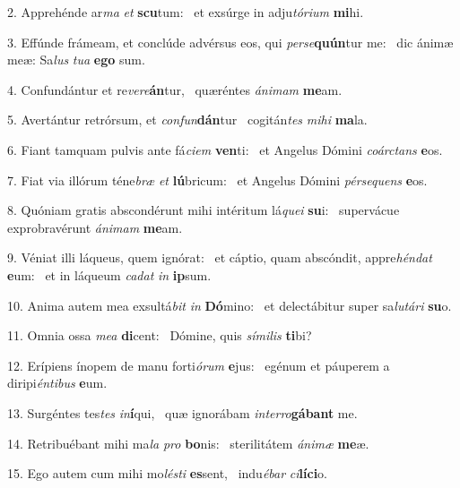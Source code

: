2. Apprehénde ar\textit{ma} \textit{et} \textbf{scu}tum: \ast\  et exsúrge in adju\textit{tó}\textit{ri}\textit{um} \textbf{mi}hi.\

3. Effúnde frámeam, et conclúde advérsus eos, qui \textit{per}\textit{se}\textbf{quún}tur me: \ast\  dic ánimæ meæ: Sa\textit{lus} \textit{tu}\textit{a} \textbf{e}\textbf{go} sum.\

4. Confundántur et re\textit{ve}\textit{re}\textbf{án}tur, \ast\  quæréntes \textit{á}\textit{ni}\textit{mam} \textbf{me}am.\

5. Avertántur retrórsum, et \textit{con}\textit{fun}\textbf{dán}tur \ast\  cogitán\textit{tes} \textit{mi}\textit{hi} \textbf{ma}la.\

6. Fiant tamquam pulvis ante fá\textit{ci}\textit{em} \textbf{ven}ti: \ast\  et Angelus Dómini \textit{co}\textit{árc}\textit{tans} \textbf{e}os.\

7. Fiat via illórum téne\textit{bræ} \textit{et} \textbf{lú}bricum: \ast\  et Angelus Dómini \textit{pér}\textit{se}\textit{quens} \textbf{e}os.\

8. Quóniam gratis abscondérunt mihi intéritum lá\textit{que}\textit{i} \textbf{su}i: \ast\  supervácue exprobravérunt \textit{á}\textit{ni}\textit{mam} \textbf{me}am.\

9. Véniat illi láqueus, quem ignórat: \dag\  et cáptio, quam abscóndit, appre\textit{hén}\textit{dat} \textbf{e}um: \ast\  et in láqueum \textit{ca}\textit{dat} \textit{in} \textbf{ip}sum.\

10. Anima autem mea exsultá\textit{bit} \textit{in} \textbf{Dó}mino: \ast\  et delectábitur super sa\textit{lu}\textit{tá}\textit{ri} \textbf{su}o.\

11. Omnia ossa \textit{me}\textit{a} \textbf{di}cent: \ast\  Dómine, quis \textit{sí}\textit{mi}\textit{lis} \textbf{ti}bi?\

12. Erípiens ínopem de manu forti\textit{ó}\textit{rum} \textbf{e}jus: \ast\  egénum et páuperem a diripi\textit{én}\textit{ti}\textit{bus} \textbf{e}um.\

13. Surgéntes tes\textit{tes} \textit{in}\textbf{í}qui, \ast\  quæ ignorábam \textit{in}\textit{ter}\textit{ro}\textbf{gá}\textbf{bant} me.\

14. Retribuébant mihi ma\textit{la} \textit{pro} \textbf{bo}nis: \ast\  sterilitátem \textit{á}\textit{ni}\textit{mæ} \textbf{me}æ.\

15. Ego autem cum mihi mo\textit{lés}\textit{ti} \textbf{es}sent, \ast\  indu\textit{é}\textit{bar} \textit{ci}\textbf{lí}\textbf{ci}o.\

